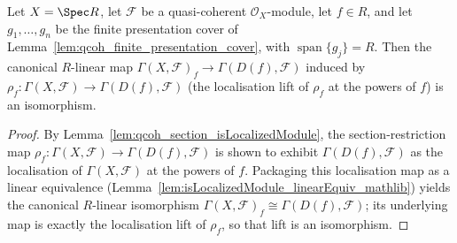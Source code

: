\begin{lemma}\leanok
  \label{lem:qcoh_section_kernel_comparison}
  Let \(X = \Spec R\), let \(\mathcal{F}\) be a quasi-coherent \(\mathcal{O}_X\)-module, let \(f \in R\),
  and let \(g_1, \ldots, g_n\) be the finite presentation cover of
  Lemma~\ref{lem:qcoh_finite_presentation_cover}, with \(\operatorname{span}\{g_j\} = R\). Then the
  canonical \(R\)-linear map \(\Gamma(X, \mathcal{F})_f \to \Gamma(D(f), \mathcal{F})\) induced by
  \(\rho_f : \Gamma(X, \mathcal{F}) \to \Gamma(D(f), \mathcal{F})\) (the localisation lift of \(\rho_f\)
  at the powers of \(f\)) is an isomorphism.
\end{lemma}
\begin{proof}
    \leanok
  By Lemma~\ref{lem:qcoh_section_isLocalizedModule}, the
  section-restriction map \(\rho_f : \Gamma(X, \mathcal{F}) \to \Gamma(D(f), \mathcal{F})\) is shown to
  exhibit \(\Gamma(D(f), \mathcal{F})\) as the localisation of \(\Gamma(X, \mathcal{F})\) at the powers of
  \(f\). Packaging this localisation map as a linear equivalence
  (Lemma~\ref{lem:isLocalizedModule_linearEquiv_mathlib})
  yields the canonical \(R\)-linear isomorphism \(\Gamma(X, \mathcal{F})_f \cong \Gamma(D(f),
  \mathcal{F})\); its underlying map is exactly the localisation lift of \(\rho_f\), so that lift is an
  isomorphism.
\end{proof}

